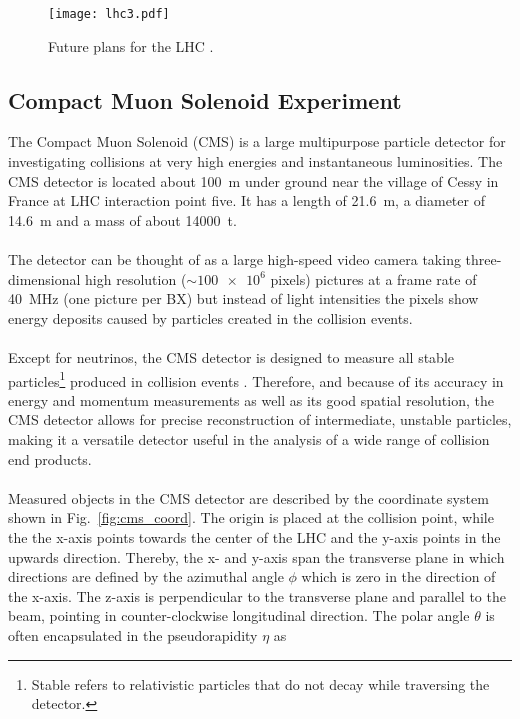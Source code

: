 \documentclass[../../main.tex]{subfiles}
\begin{document}
\begin{figure}[htp]
	\begin{center}
		\texttt{[image: lhc3.pdf]}
		\caption{Future plans for the LHC \cite{hl_lhc_schedule}.}
		\label{fig:hl_lhc}
	\end{center}
\end{figure}

\subsection{Compact Muon Solenoid Experiment}\label{sec:cms}
The Compact Muon Solenoid (CMS) \cite{Collaboration_2008,Bayatian:922757} is a large multipurpose particle detector for investigating collisions at very high energies and instantaneous luminosities. The CMS detector is located about \SI{100}{m} under ground near the village of Cessy in France at LHC interaction point five. It has a length of \SI{21.6}{m}, a diameter of \SI{14.6}{m} and a mass of about \SI{14000}{t}.\\
\\
The detector can be thought of as a large high-speed video camera \cite{tq} taking three-dimensional high resolution ($\sim\num{100e6}$ pixels) pictures at a frame rate of \SI{40}{MHz} (one picture per BX) but instead of light intensities the pixels show energy deposits caused by particles created in the collision events.\\
\\
Except for neutrinos, the CMS detector is designed to measure all stable particles\footnote{Stable refers to relativistic particles that do not decay while traversing the detector.} produced in collision events \cite{mr}. Therefore, and because of its accuracy in energy and momentum measurements as well as its good spatial resolution, the CMS detector allows for precise reconstruction of intermediate, unstable particles, making it a versatile detector useful in the analysis of a wide range of collision end products.\\
\\
Measured objects in the CMS detector are described by the coordinate system shown in Fig.~\ref{fig:cms_coord}. The origin is placed at the collision point, while the the x-axis points towards the center of the LHC and the y-axis points in the upwards direction. Thereby, the x- and y-axis span the transverse plane in which directions are defined by the azimuthal angle $\phi$ which is zero in the direction of the x-axis. The z-axis is perpendicular to the transverse plane and parallel to the beam, pointing in counter-clockwise longitudinal direction. The polar angle $\theta$ is often encapsulated in the pseudorapidity $\eta$ as
\end{document}
